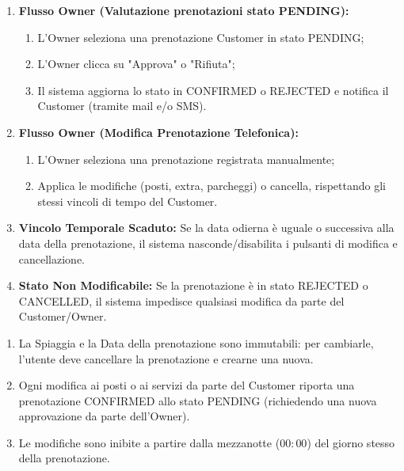 \documentclass{article}
\begin{document}
	{
		\begin{enumerate}[nosep, leftmargin=25px]
			\item[\textbf{5a.}] \textbf{Flusso Owner (Valutazione prenotazioni stato PENDING):} 
			\begin{enumerate}[nosep, leftmargin=*]
				\item[i.] L'Owner seleziona una prenotazione Customer in stato PENDING;
				\item[ii.] L'Owner clicca su "Approva" o "Rifiuta";
				\item[iii.] Il sistema aggiorna lo stato in CONFIRMED o REJECTED e notifica il Customer (tramite mail e/o SMS).
			\end{enumerate}
			\item[\textbf{5b.}] \textbf{Flusso Owner (Modifica Prenotazione Telefonica):} 
			\begin{enumerate}[nosep, leftmargin=*]
				\item[i.] L'Owner seleziona una prenotazione registrata manualmente;
				\item[ii.] Applica le modifiche (posti, extra, parcheggi) o cancella, rispettando gli stessi vincoli di tempo del Customer.
			\end{enumerate}
			\item[\textbf{4a-e.}] \textbf{Vincolo Temporale Scaduto:} Se la data odierna è uguale o successiva alla data della prenotazione, il sistema nasconde/disabilita i pulsanti di modifica e cancellazione.
			\item[\textbf{4b-e.}] \textbf{Stato Non Modificabile:} Se la prenotazione è in stato REJECTED o CANCELLED, il sistema impedisce qualsiasi modifica da parte del Customer/Owner.
		\end{enumerate}
	}
	{
		\begin{enumerate}[nosep, leftmargin=*]
			\item[•] La Spiaggia e la Data della prenotazione sono immutabili: per cambiarle, l'utente deve cancellare la prenotazione e crearne una nuova.
			\item[•] Ogni modifica ai posti o ai servizi da parte del Customer riporta una prenotazione CONFIRMED allo stato PENDING (richiedendo una nuova approvazione da parte dell'Owner).
			\item[•] Le modifiche sono inibite a partire dalla mezzanotte ($00:00$) del giorno stesso della prenotazione.
		\end{enumerate}
	}
		
	\newpage
	
\end{document}
